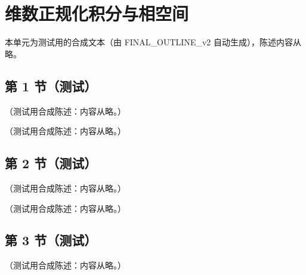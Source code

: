 \chapter{维数正规化积分与相空间}\label{app:appC}
本单元为测试用的合成文本（由 FINAL\_OUTLINE\_v2 自动生成），陈述内容从略。

\section{第 1 节（测试）}\label{sec:appC-msbar}

\begin{remark}\label{rem:appC-Seps}
（测试用合成陈述：内容从略。）
\end{remark}

\begin{remark}[$D$ 维劈裂核与平均约定]\label{rem:appC-d-kernels}
（测试用合成陈述：内容从略。）
\end{remark}

\section{第 2 节（测试）}\label{sec:appC-integrals}

\begin{lemma}[单圈两点函数]\label{lem:appC-bubble}
（测试用合成陈述：内容从略。）
\end{lemma}

\begin{lemma}\label{lem:appC-ibp}
（测试用合成陈述：内容从略。）
\end{lemma}

\section{第 3 节（测试）}\label{sec:appC-phase-space}

\begin{lemma}[$D$ 维相空间]\label{lem:appC-phase-space}
（测试用合成陈述：内容从略。）
\end{lemma}
